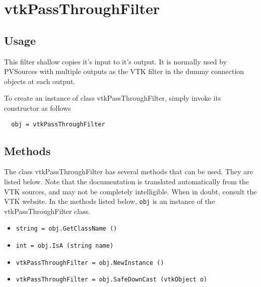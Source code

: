 \section{vtkPassThroughFilter}

\subsection{Usage}

 This filter shallow copies it's input to it's output. It is normally
 used by PVSources with multiple outputs as the VTK filter in the
 dummy connection objects at each output.

To create an instance of class vtkPassThroughFilter, simply
invoke its constructor as follows
\begin{verbatim}
  obj = vtkPassThroughFilter
\end{verbatim}
\subsection{Methods}

The class vtkPassThroughFilter has several methods that can be used.
  They are listed below.
Note that the documentation is translated automatically from the VTK sources,
and may not be completely intelligible.  When in doubt, consult the VTK website.
In the methods listed below, \verb|obj| is an instance of the vtkPassThroughFilter class.
\begin{itemize}
\item  \verb|string = obj.GetClassName ()|

\item  \verb|int = obj.IsA (string name)|

\item  \verb|vtkPassThroughFilter = obj.NewInstance ()|

\item  \verb|vtkPassThroughFilter = obj.SafeDownCast (vtkObject o)|

\end{itemize}
